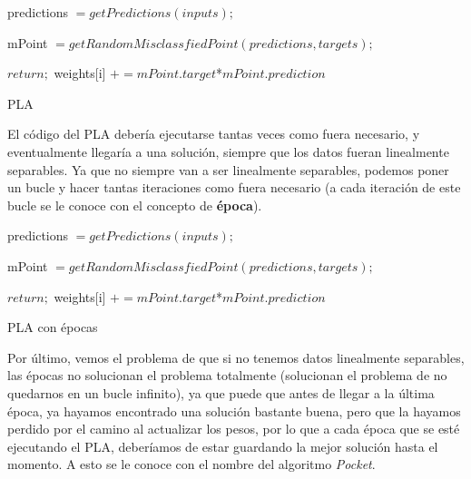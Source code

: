 \vspace{2mm}
\begin{algorithm}[H]
    predictions $= getPredictions(inputs);$
    
    mPoint $= getRandomMisclassfiedPoint(predictions, targets);$
    
    {
		$return;$
	}
	{
        {
            weights[i] $+= mPoint.target$*$mPoint.prediction$
        }
	}
	\caption{PLA}
	\label{alg:pla}
\end{algorithm}
\vspace{2mm}

El código del PLA debería ejecutarse tantas veces como fuera necesario, y eventualmente llegaría a una solución, siempre que los datos fueran linealmente separables. Ya que no siempre van a ser linealmente separables, podemos poner un bucle y hacer tantas iteraciones como fuera necesario (a cada iteración de este bucle se le conoce con el concepto de \textbf{época}).

\vspace{2mm}
\begin{algorithm}[H]
    {
        predictions $= getPredictions(inputs);$
        
        mPoint $= getRandomMisclassfiedPoint(predictions, targets);$
        
        {
    		$return;$
    	}
    	{
            {
                weights[i] $+= mPoint.target$*$mPoint.prediction$
            }
    	}
	}
	\caption{PLA con épocas}
	\label{alg:plawithepochs}
\end{algorithm}
\vspace{2mm}

Por último, vemos el problema de que si no tenemos datos linealmente separables, las épocas no solucionan el problema totalmente (solucionan el problema de no quedarnos en un bucle infinito), ya que puede que antes de llegar a la última época, ya hayamos encontrado una solución bastante buena, pero que la hayamos perdido por el camino al actualizar los pesos, por lo que a cada época que se esté ejecutando el PLA, deberíamos de estar guardando la mejor solución hasta el momento. A esto se le conoce con el nombre del algoritmo \textit{Pocket}.

